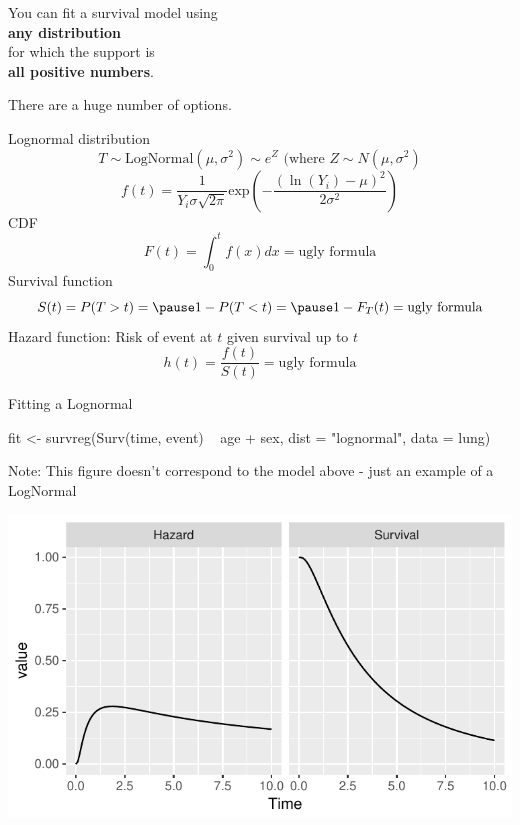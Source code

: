 \documentclass{beamer}
\newcommand\bblue[1]{{\color{blue}\textbf{#1}}}
\begin{document}
\begin{frame}
\Large \centering
You can fit a survival model using \\ \bblue{any distribution} \\ for which the support is \\ \bblue{all positive numbers}. \bigskip

There are a huge number of options.

\end{frame}

\begin{frame}{Lognormal distribution}
$$T\sim \text{LogNormal} (\mu,\sigma^2) \sim e^Z\text{ (where }Z\sim N(\mu,\sigma^2)$$
$$f(t) = \frac{1}{Y_i \sigma\sqrt{2\pi}} \text{exp}\left(-\frac{(\ln (Y_i) - \mu)^2}{2\sigma^2}\right)$$
CDF
$$F(t) = \int_0^t f(x) dx = \text{ugly formula}$$
Survival function
$$S(t) = P(T > t) = \pause 1 - P(T<t) = \pause 1 - F_T(t) = \text{ugly formula}$$
Hazard function: \pause Risk of event at $t$ given survival up to $t$ \pause
$$h(t) = \frac{f(t)}{S(t)} = \text{ugly formula}$$
\end{frame}

\begin{frame}[fragile]{Fitting a Lognormal}
\begin{scriptsize}
\begin{semiverbatim}
fit <- survreg(Surv(time, event) ~ age + sex,
               dist = "lognormal",
               data = lung)
\end{semiverbatim}
\end{scriptsize}
Note: This figure doesn't correspond to the model above - just an example of a LogNormal
\begin{center}\includegraphics[width = .7\textwidth]{figs/LogNormalExample} \end{center}
\end{frame}
\end{document}
